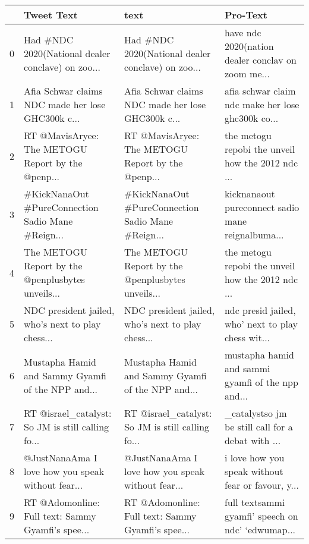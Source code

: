 \begin{tabular}{llll}
\toprule
{} &                                         Tweet Text &                                               text &                                           Pro-Text \\
\midrule
0 &  Had \#NDC 2020(National dealer conclave) on zoo... &  Had \#NDC 2020(National dealer conclave) on zoo... &  have ndc 2020(nation dealer conclav on zoom me... \\
1 &  Afia Schwar claims NDC made her lose GHC300k c... &  Afia Schwar claims NDC made her lose GHC300k c... &  afia schwar claim ndc make her lose ghc300k co... \\
2 &  RT @MavisAryee: The METOGU Report by the @penp... &  RT @MavisAryee: The METOGU Report by the @penp... &  the metogu repobi the unveil how the 2012 ndc ... \\
3 &  \#KickNanaOut \#PureConnection Sadio Mane \#Reign... &  \#KickNanaOut \#PureConnection Sadio Mane \#Reign... &  kicknanaout pureconnect sadio mane reignalbuma... \\
4 &  The METOGU Report by the @penplusbytes unveils... &  The METOGU Report by the @penplusbytes unveils... &  the metogu repobi the unveil how the 2012 ndc ... \\
5 &  NDC president jailed, who’s next to play chess... &  NDC president jailed, who’s next to play chess... &  ndc presid jailed, who’ next to play chess wit... \\
6 &  Mustapha Hamid and Sammy Gyamfi of the NPP and... &  Mustapha Hamid and Sammy Gyamfi of the NPP and... &  mustapha hamid and sammi gyamfi of the npp and... \\
7 &  RT @israel\_catalyst: So JM is still calling fo... &  RT @israel\_catalyst: So JM is still calling fo... &  \_catalystso jm be still call for a debat with ... \\
8 &  @JustNanaAma I love how you speak without fear... &  @JustNanaAma I love how you speak without fear... &  i love how you speak without fear or favour, y... \\
9 &  RT @Adomonline: Full text: Sammy Gyamfi’s spee... &  RT @Adomonline: Full text: Sammy Gyamfi’s spee... &  full textsammi gyamfi’ speech on ndc’ ‘edwumap... \\
\bottomrule
\end{tabular}
